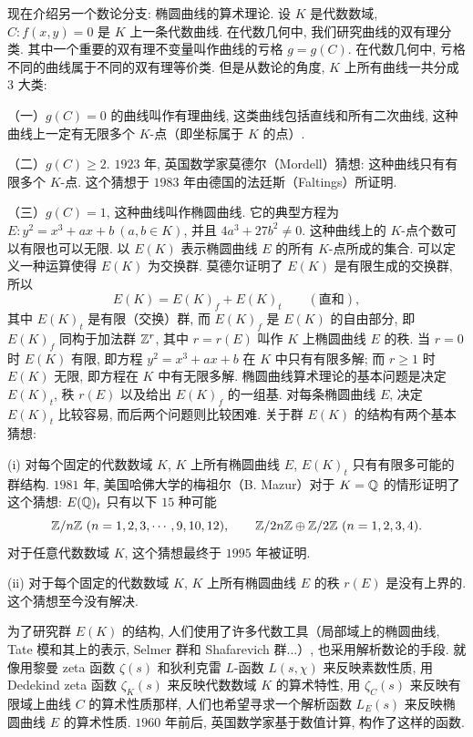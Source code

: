 现在介绍另一个数论分支: 椭圆曲线的算术理论. 设 $K$ 是代数数域, $C\colon f(x,y)=0$ 是 $K$ 上一条代数曲线. 在代数几何中, 我们研究曲线的双有理分类. 其中一个重要的双有理不变量叫作曲线的亏格 $g=g(C)$. 在代数几何中, 亏格不同的曲线属于不同的双有理等价类. 但是从数论的角度, $K$ 上所有曲线一共分成 $3$ 大类:

（一）$g(C)=0$ 的曲线叫作有理曲线, 这类曲线包括直线和所有二次曲线, 这种曲线上一定有无限多个 $K$-点（即坐标属于 $K$ 的点）.

（二）$g(C)\geqslant 2$. $1923$ 年, 英国数学家莫德尔（Mordell）猜想: 这种曲线只有有限多个 $K$-点. 这个猜想于 $1983$ 年由德国的法廷斯（Faltings）所证明.

（三）$g(C)=1$, 这种曲线叫作椭圆曲线. 它的典型方程为 $E\colon y^2=x^3+ax+b\ (a,b\in K)$, 并且 $4a^3+27b^2\neq 0$. 这种曲线上的 $K$-点个数可以有限也可以无限. 以 $E(K)$ 表示椭圆曲线 $E$ 的所有 $K$-点所成的集合. 可以定义一种运算使得 $E(K)$ 为交换群. 莫德尔证明了 $E(K)$ 是有限生成的交换群, 所以
\[
  E(K)=E(K)_f+E(K)_t\qquad(\text{直和}),
\]
其中 $E(K)_t$ 是有限（交换）群, 而 $E(K)_f$ 是 $E(K)$ 的自由部分, 即 $E(K)_f$ 同构于加法群 $\mathbb{Z}^r$, 其中 $r=r(E)$ 叫作 $K$ 上椭圆曲线 $E$ 的秩. 当 $r=0$ 时 $E(K)$ 有限, 即方程 $y^2=x^3+ax+b$ 在 $K$ 中只有有限多解; 而 $r\geqslant 1$ 时 $E(K)$ 无限, 即方程在 $K$ 中有无限多解. 椭圆曲线算术理论的基本问题是决定 $E(K)_t$, 秩 $r(E)$ 以及给出 $E(K)_f$ 的一组基. 对每条椭圆曲线 $E$, 决定 $E(K)_t$ 比较容易, 而后两个问题则比较困难. 关于群 $E(K)$ 的结构有两个基本猜想:

(i) 对每个固定的代数数域 $K$, $K$ 上所有椭圆曲线 $E$, $E(K)_t$ 只有有限多可能的群结构. $1981$ 年, 美国哈佛大学的梅祖尔（B. Mazur）对于 $K=\mathbb{Q}$ 的情形证明了这个猜想: $E(\mathbb{Q})_t$ 只有以下 $15$ 种可能
\[
  \Z/n\Z\ (n=1,2,3,\cdots,9,10,12),\qquad
  \Z/2n\Z\oplus\Z/2\Z\ (n=1,2,3,4).
\]
对于任意代数数域 $K$, 这个猜想最终于 $1995$ 年被证明.

(ii) 对于每个固定的代数数域 $K$, $K$ 上所有椭圆曲线 $E$ 的秩 $r(E)$ 是没有上界的. 这个猜想至今没有解决.

为了研究群 $E(K)$ 的结构, 人们使用了许多代数工具（局部域上的椭圆曲线, Tate 模和其上的表示, Selmer 群和 Shafarevich 群...）, 也采用解析数论的手段. 就像用黎曼 zeta 函数 $\zeta(s)$ 和狄利克雷 $L$-函数 $L(s,\chi)$ 来反映素数性质, 用 Dedekind zeta 函数 $\zeta_K(s)$ 来反映代数数域 $K$ 的算术特性, 用 $\zeta_C(s)$ 来反映有限域上曲线 $C$ 的算术性质那样, 人们也希望寻求一个解析函数 $L_E(s)$ 来反映椭圆曲线 $E$ 的算术性质. $1960$ 年前后, 英国数学家基于数值计算, 构作了这样的函数.

